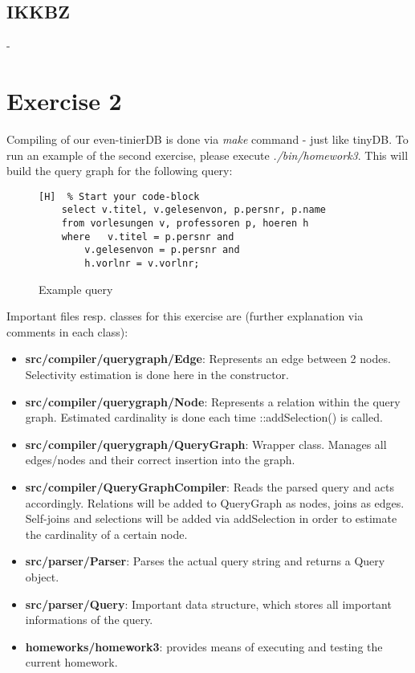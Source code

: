 \documentclass[paper=a4, fontsize=11pt]{scrartcl} %
\numberwithin{equation}{section} %
\numberwithin{figure}{section} %
\numberwithin{table}{section} %
\begin{document}
\subsection{IKKBZ}
-
\section{Exercise 2}
Compiling of our even-tinierDB is done via \textit{make} command - just like tinyDB. To run an example of the second exercise, please execute \textit{./bin/homework3}. This will build the query graph for the following query:
 \begin{figure}[H]
 \begin{lstlisting}[frame=single][H]  % Start your code-block
	select v.titel, v.gelesenvon, p.persnr, p.name
	from vorlesungen v, professoren p, hoeren h 
	where 	v.titel = p.persnr and 
		v.gelesenvon = p.persnr and 
		h.vorlnr = v.vorlnr;
\end{lstlisting}
\caption{Example query}
\end{figure}

Important files resp. classes for this exercise are (further explanation via comments in each class):
\begin{itemize}
	\item \textbf{src/compiler/querygraph/Edge}: Represents an edge between 2 nodes. Selectivity estimation is done here in the constructor.
	\item \textbf{src/compiler/querygraph/Node}: Represents a relation within the query graph. Estimated cardinality is done each time ::addSelection() is called.
	\item \textbf{src/compiler/querygraph/QueryGraph}: Wrapper class. Manages all edges/nodes and their correct insertion into the graph.
	\item \textbf{src/compiler/QueryGraphCompiler}: Reads the parsed query and acts accordingly. Relations will be added to QueryGraph as nodes, joins as edges. Self-joins and selections will be added via addSelection in order to estimate the cardinality of a certain node.
	\item \textbf{src/parser/Parser}: Parses the actual query string and returns a Query object.
	\item \textbf{src/parser/Query}: Important data structure, which stores all important informations of the query.
	\item \textbf{homeworks/homework3}: provides means of executing and testing the current homework.
	
\end{itemize}
\end{document}

